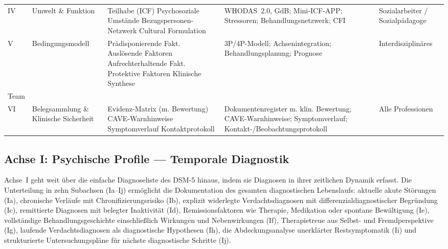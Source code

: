 \documentclass[11pt,a4paper]{article}
\begin{document}
\begin{table}[H]
\begin{tabularx}{\textwidth}{@{}L{0.8cm}L{2.1cm}L{3.3cm}Y L{2.2cm}@{}}
\addlinespace
IV & Umwelt \& Funktion & Teilhabe (ICF) \newline Psychosoziale Umst\"ande \newline Bezugspersonen-Netzwerk \newline Cultural Formulation & WHODAS~2.0, GdB; Mini-ICF-APP; Stressoren; Behandlungsnetzwerk; CFI & Sozialarbeiter / Sozialp\"adagoge \\
\addlinespace
V & Bedingungsmodell & Pr\"adisponierende Fakt. \newline Ausl\"osende Faktoren \newline Aufrechterhaltende Fakt. \newline Protektive Faktoren \newline Klinische Synthese & 3P/4P-Modell; Achsen\-integration; Behandlungs\-planung; Prognose & Interdisziplin\"ares\\Team \\
\addlinespace
VI & Belegsammlung \& Klinische Sicherheit & Evidenz-Matrix (m. Bewertung) \newline CAVE-Warnhinweise \newline Symptomverlauf \newline Kontaktprotokoll & Dokumentenregister m. klin. Bewertung; CAVE-Warnhinweise; Symptomverlauf; Kontakt-/Beobachtungs\-protokoll & Alle Professionen \\
\bottomrule
\end{tabularx}
\normalsize
\end{table}

\subsection{Achse I: Psychische Profile --- Temporale Diagnostik}
\label{sec:achse1}

Achse~I geht weit \"uber die einfache Diagnoseliste des DSM-5 hinaus, indem sie Diagnosen in ihrer zeitlichen Dynamik erfasst. Die Unterteilung in zehn Subachsen (Ia--Ij) erm\"oglicht die Dokumentation des gesamten diagnostischen Lebenslaufs: aktuelle akute St\"orungen (Ia), chronische Verl\"aufe mit Chronifizierungsrisiko (Ib), explizit widerlegte Verdachtsdiagnosen mit differenzialdiagnostischer Begr\"undung (Ic), remittierte Diagnosen mit belegter Inaktivit\"at (Id), Remissionsfaktoren wie Therapie, Medikation oder spontane Bew\"altigung (Ie), vollst\"andige Behandlungsgeschichte einschlie\ss{}lich Wirkungen und Nebenwirkungen (If), Therapietreue aus Selbst- und Fremdperspektive (Ig), laufende Verdachtsdiagnosen als diagnostische Hypothesen (Ih), die Abdeckungsanalyse unerkl\"arter Restsymptomatik (Ii) und strukturierte Untersuchungspl\"ane f\"ur n\"achste diagnostische Schritte (Ij).
\end{document}
